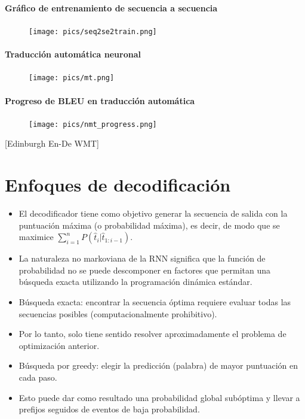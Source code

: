 \documentclass{book}
\begin{document}
\paragraph{Gráfico de entrenamiento de secuencia a secuencia}
         \begin{figure}[h]
        	\texttt{[image: pics/seq2se2train.png]}
        \end{figure}





\paragraph{Traducción automática neuronal}
         \begin{figure}[h]
        	\texttt{[image: pics/mt.png]}
        \end{figure}

\paragraph{Progreso de BLEU en traducción automática}
         \begin{figure}[h]
        	\texttt{[image: pics/nmt\_progress.png]}
        \end{figure}
[Edinburgh En-De WMT]


\section{Enfoques de decodificación}
\begin{itemize}
\item El decodificador tiene como objetivo generar la secuencia de salida con la puntuación máxima (o probabilidad máxima), es decir, de modo que se maximice $\sum_{i=1}^{n}P(\hat{t}_i | \hat{t}_{1:i-1})$.
\item La naturaleza no markoviana de la RNN significa que la función de probabilidad no se puede descomponer en factores que permitan una búsqueda exacta utilizando la programación dinámica estándar.
\item Búsqueda exacta: encontrar la secuencia óptima requiere evaluar todas las secuencias posibles (computacionalmente prohibitivo).
\item Por lo tanto, solo tiene sentido resolver aproximadamente el problema de optimización anterior.
\item Búsqueda por greedy: elegir la predicción (palabra) de mayor puntuación en cada paso.
\item Esto puede dar como resultado una probabilidad global subóptima y llevar a prefijos seguidos de eventos de baja probabilidad.
\end{itemize}
\end{document}
